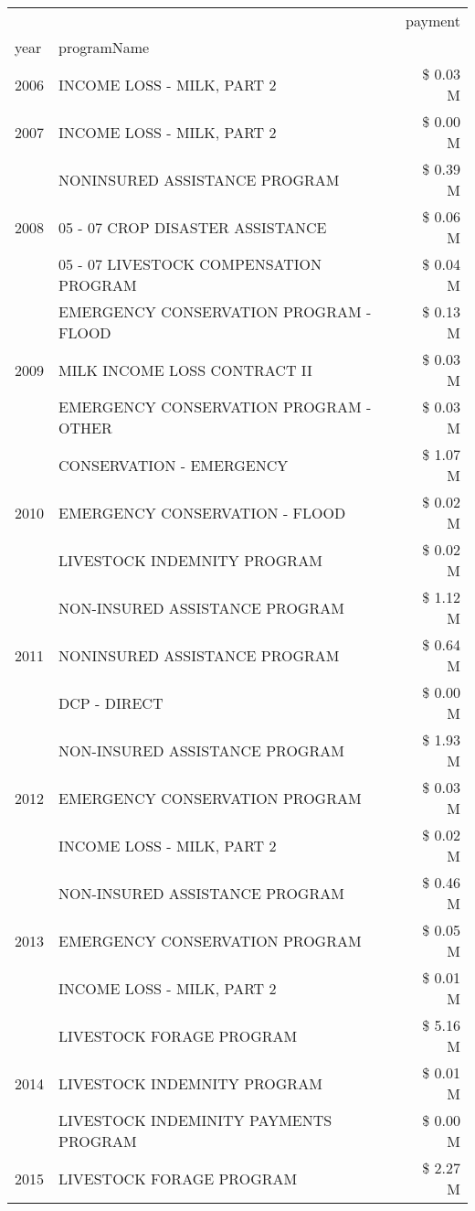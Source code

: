 \begin{tabular}{llr}
\toprule
 &  & payment \\
year & programName &  \\
\midrule
2006 & INCOME LOSS - MILK, PART 2 & \$ 0.03 M \\
\cline{1-3}
2007 & INCOME LOSS - MILK, PART 2 & \$ 0.00 M \\
\cline{1-3}
\multirow[t]{3}{*}{2008} & NONINSURED ASSISTANCE PROGRAM & \$ 0.39 M \\
 & 05 - 07 CROP DISASTER ASSISTANCE & \$ 0.06 M \\
 & 05 - 07 LIVESTOCK COMPENSATION PROGRAM & \$ 0.04 M \\
\cline{1-3}
\multirow[t]{3}{*}{2009} & EMERGENCY CONSERVATION PROGRAM - FLOOD & \$ 0.13 M \\
 & MILK INCOME LOSS CONTRACT II & \$ 0.03 M \\
 & EMERGENCY CONSERVATION PROGRAM - OTHER & \$ 0.03 M \\
\cline{1-3}
\multirow[t]{3}{*}{2010} & CONSERVATION - EMERGENCY & \$ 1.07 M \\
 & EMERGENCY CONSERVATION - FLOOD & \$ 0.02 M \\
 & LIVESTOCK INDEMNITY PROGRAM & \$ 0.02 M \\
\cline{1-3}
\multirow[t]{3}{*}{2011} & NON-INSURED ASSISTANCE PROGRAM & \$ 1.12 M \\
 & NONINSURED ASSISTANCE PROGRAM & \$ 0.64 M \\
 & DCP - DIRECT & \$ 0.00 M \\
\cline{1-3}
\multirow[t]{3}{*}{2012} & NON-INSURED ASSISTANCE PROGRAM & \$ 1.93 M \\
 & EMERGENCY CONSERVATION PROGRAM & \$ 0.03 M \\
 & INCOME LOSS - MILK, PART 2 & \$ 0.02 M \\
\cline{1-3}
\multirow[t]{3}{*}{2013} & NON-INSURED ASSISTANCE PROGRAM & \$ 0.46 M \\
 & EMERGENCY CONSERVATION PROGRAM & \$ 0.05 M \\
 & INCOME LOSS - MILK, PART 2 & \$ 0.01 M \\
\cline{1-3}
\multirow[t]{3}{*}{2014} & LIVESTOCK FORAGE PROGRAM & \$ 5.16 M \\
 & LIVESTOCK INDEMNITY PROGRAM & \$ 0.01 M \\
 & LIVESTOCK INDEMINITY PAYMENTS PROGRAM & \$ 0.00 M \\
\cline{1-3}
\multirow[t]{3}{*}{2015} & LIVESTOCK FORAGE PROGRAM & \$ 2.27 M \\

\end{tabular}
